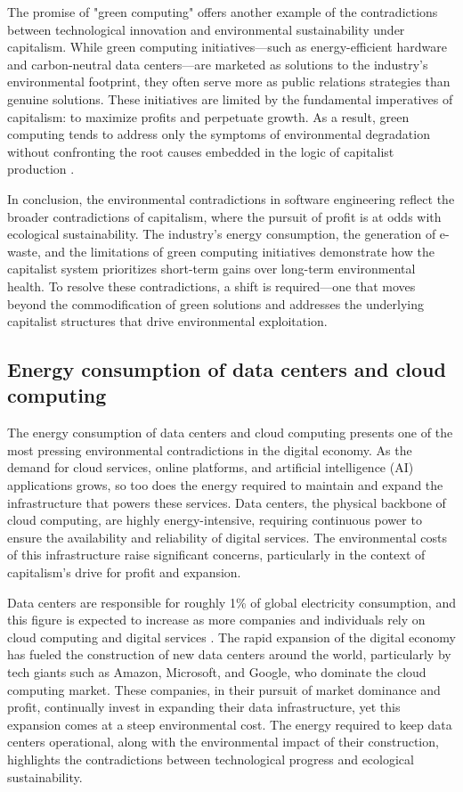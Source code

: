 \begin{refsection}
The promise of "green computing" offers another example of the contradictions between technological innovation and environmental sustainability under capitalism. While green computing initiatives—such as energy-efficient hardware and carbon-neutral data centers—are marketed as solutions to the industry’s environmental footprint, they often serve more as public relations strategies than genuine solutions. These initiatives are limited by the fundamental imperatives of capitalism: to maximize profits and perpetuate growth. As a result, green computing tends to address only the symptoms of environmental degradation without confronting the root causes embedded in the logic of capitalist production \cite[pp.~75-78]{mazzucato2020}. 

In conclusion, the environmental contradictions in software engineering reflect the broader contradictions of capitalism, where the pursuit of profit is at odds with ecological sustainability. The industry's energy consumption, the generation of e-waste, and the limitations of green computing initiatives demonstrate how the capitalist system prioritizes short-term gains over long-term environmental health. To resolve these contradictions, a shift is required—one that moves beyond the commodification of green solutions and addresses the underlying capitalist structures that drive environmental exploitation.

\subsection{Energy consumption of data centers and cloud computing}

The energy consumption of data centers and cloud computing presents one of the most pressing environmental contradictions in the digital economy. As the demand for cloud services, online platforms, and artificial intelligence (AI) applications grows, so too does the energy required to maintain and expand the infrastructure that powers these services. Data centers, the physical backbone of cloud computing, are highly energy-intensive, requiring continuous power to ensure the availability and reliability of digital services. The environmental costs of this infrastructure raise significant concerns, particularly in the context of capitalism’s drive for profit and expansion.

Data centers are responsible for roughly 1\% of global electricity consumption, and this figure is expected to increase as more companies and individuals rely on cloud computing and digital services \cite[pp.~7-9]{masanet2020}. The rapid expansion of the digital economy has fueled the construction of new data centers around the world, particularly by tech giants such as Amazon, Microsoft, and Google, who dominate the cloud computing market. These companies, in their pursuit of market dominance and profit, continually invest in expanding their data infrastructure, yet this expansion comes at a steep environmental cost. The energy required to keep data centers operational, along with the environmental impact of their construction, highlights the contradictions between technological progress and ecological sustainability.


\end{refsection}
